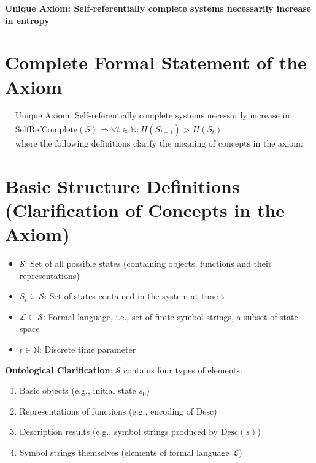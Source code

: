 
\textbf{Unique Axiom: Self-referentially complete systems necessarily increase in entropy}

\section{Complete Formal Statement of the Axiom}
\label{sec:ch02_axiom:complete-formal-statement-of-the-axiom}

\begin{tcolorbox}[colback=gray!10,colframe=black]
\begin{equation*}
\begin{aligned}
&\text{Unique Axiom: Self-referentially complete systems necessarily increase in entropy} \\
&\text{SelfRefComplete}(S) \Rightarrow \forall t \in \mathbb{N}: H(S_{t+1}) > H(S_t) \\
&\text{where the following definitions clarify the meaning of concepts in the axiom:}
\end{aligned}
\end{equation*}
\end{tcolorbox}

\section{Basic Structure Definitions (Clarification of Concepts in the Axiom)}
\label{sec:ch02_axiom:basic-structure-definitions-clarification-of-concepts-in-the-axiom}

\begin{itemize}
\item $\mathcal{S}$: Set of all possible states (containing objects, functions and their representations)
\item $S_t \subseteq \mathcal{S}$: Set of states contained in the system at time t
\item $\mathcal{L} \subseteq \mathcal{S}$: Formal language, i.e., set of finite symbol strings, a subset of state space
\item $t \in \mathbb{N}$: Discrete time parameter
\end{itemize}

\textbf{Ontological Clarification}: $\mathcal{S}$ contains four types of elements:
\begin{enumerate}
\item Basic objects (e.g., initial state $s_0$)
\item Representations of functions (e.g., encoding of $\text{Desc}$)
\item Description results (e.g., symbol strings produced by $\text{Desc}(s)$)
\item Symbol strings themselves (elements of formal language $\mathcal{L}$)
\end{enumerate}

